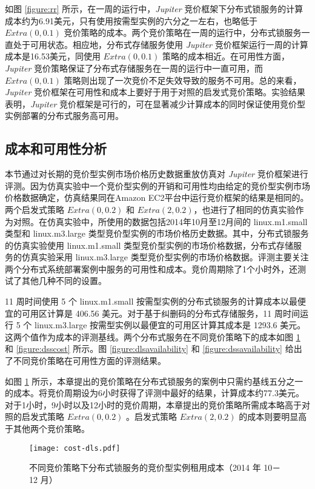 如图 \ref{figure:rr} 所示，在一周的运行中，\emph{Jupiter} 竞价框架下分布式锁服务的计算成本约为6.91美元，只有使用按需型实例的六分之一左右，也略低于 $Extra(0, 0.1)$ 竞价策略的成本。两个竞价策略在一周的运行中，分布式锁服务一直处于可用状态。相应地，分布式存储服务使用 \emph{Jupiter} 竞价框架运行一周的计算成本是16.53美元，同使用 $Extra(0, 0.1)$ 策略的成本相近。在可用性方面，\emph{Jupiter} 竞价策略保证了分布式存储服务在一周的运行中一直可用，而 $Extra(0, 0.1)$ 策略则出现了一次竞价不足失效导致的服务不可用。总的来看，\emph{Jupiter} 竞价框架在可用性和成本上要好于用于对照的启发式竞价策略。实验结果表明，\emph{Jupiter} 竞价框架是可行的，可在显著减少计算成本的同时保证使用竞价型实例部署的分布式服务高可用。

\subsection{成本和可用性分析}
\label{subsec:ca}
本节通过对长期的竞价型实例市场价格历史数据重放仿真对 \emph{Jupiter} 竞价框架进行评测。因为仿真实验中一个竞价型实例的开销和可用性均由给定的竞价型实例市场价格数据确定，仿真结果同在Amazon EC2平台中运行竞价框架的结果是相同的。两个启发式策略 $Extra(0, 0.2)$ 和 $Extra(2, 0.2)$，也进行了相同的仿真实验作为对照。在仿真实验中，所使用的数据包括2014年10月至12月间的 linux.m1.small 类型和 linux.m3.large 类型竞价型实例的市场价格历史数据。其中，分布式锁服务的仿真实验使用 linux.m1.small 类型竞价型实例的市场价格数据，分布式存储服务的仿真实验采用 linux.m3.large 类型竞价型实例的市场价格数据。评测主要关注两个分布式系统部署案例中服务的可用性和成本。竞价周期除了1个小时外，还测试了其他几种不同的设置。

11 周时间使用 5 个 linux.m1.small 按需型实例的分布式锁服务的计算成本以最便宜的可用区计算是 406.56 美元。对于基于纠删码的分布式存储服务，11 周时间运行 5 个 linux.m3.large 按需型实例以最便宜的可用区计算其成本是 1293.6 美元。这两个值作为成本的评测基线。两个分布式服务在不同竞价策略下的成本如图 \ref{figure:dlscost} 和 \ref{figure:dsscost} 所示。图 \ref{figure:dlsavailability} 和 \ref{figure:dssavailability} 给出了不同竞价策略在可用性方面的评测结果。

如图 \ref{figure:dlscost} 所示，本章提出的竞价策略在分布式锁服务的案例中只需约基线五分之一的成本。将竞价周期设为6小时获得了评测中最好的结果，计算成本约77.3美元。对于1小时，9小时以及12小时的竞价周期，本章提出的竞价策略所需成本略高于对照的启发式策略 $Extra(0, 0.2)$ 。启发式策略 $Extra(2, 0.2)$ 的成本则要明显高于其他两个竞价策略。
\begin{figure}
  \centering
  \texttt{[image: cost-dls.pdf]}
  \caption{不同竞价策略下分布式锁服务的竞价型实例租用成本（2014 年 10－12 月）}
  \label{figure:dlscost}
\end{figure}

